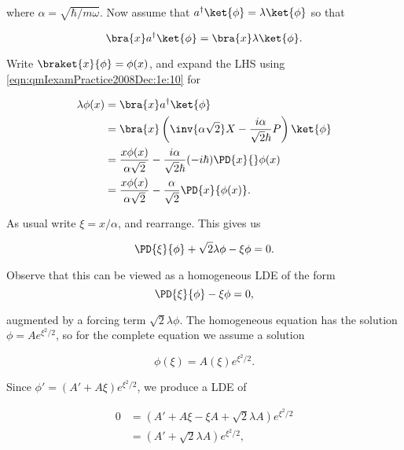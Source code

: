 where $\alpha = \sqrt{\hbar/m \omega}$.  Now assume that $a^\dagger \ket{\phi} = \lambda \ket{\phi}$ so that 

\begin{equation}\label{eqn:qmIexamPractice2008Dec:1e:20}
\bra{x} a^\dagger \ket{\phi} = \bra{x} \lambda \ket{\phi}.
\end{equation}

Write $\braket{x}{\phi} = \phi(x)$, and expand the LHS using \ref{eqn:qmIexamPractice2008Dec:1e:10} for

\begin{align*}
\lambda \phi(x) 
&= \bra{x} a^\dagger \ket{\phi}  \\
&= \bra{x} \left( \inv{ \alpha \sqrt{2} } X - \frac{ i \alpha }{\sqrt{2} \hbar } P \right) \ket{\phi} \\
&= \frac{x \phi(x)}{ \alpha \sqrt{2} } - \frac{ i \alpha }{\sqrt{2} \hbar } (-i\hbar)\PD{x}{} \phi(x) \\
&= \frac{x \phi(x)}{ \alpha \sqrt{2} } - \frac{ \alpha }{\sqrt{2} } \PD{x}{\phi(x)}.
\end{align*}

As usual write $\xi = x/\alpha$, and rearrange.  This gives us

\begin{equation}\label{eqn:qmIexamPractice2008Dec:1e:30}
\PD{\xi}{\phi} +\sqrt{2} \lambda \phi - \xi \phi = 0.
\end{equation}

Observe that this can be viewed as a homogeneous LDE of the form
\begin{equation}\label{eqn:qmIexamPractice2008Dec:1e:40}
\PD{\xi}{\phi} - \xi \phi = 0,
\end{equation}

augmented by a forcing term $\sqrt{2}\lambda \phi$.  The homogeneous equation has the solution $\phi = A e^{\xi^2/2}$, so for the complete equation we assume a solution 

\begin{equation}\label{eqn:qmIexamPractice2008Dec:1e:50}
\phi(\xi) = A(\xi) e^{\xi^2/2}.
\end{equation}

Since $\phi' = (A' + A \xi) e^{\xi^2/2}$, we produce a LDE of

\begin{align*}
0 &= (A' + A \xi -\xi A + \sqrt{2} \lambda A ) e^{\xi^2/2} \\
&= (A' + \sqrt{2} \lambda A ) e^{\xi^2/2},
\end{align*}

